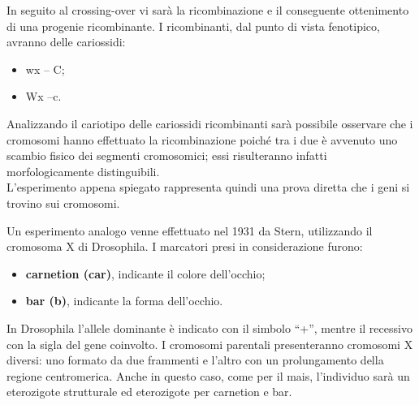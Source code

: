 \documentclass[11pt]{book}
\begin{document}
In seguito al crossing-over vi sarà la ricombinazione e il conseguente ottenimento di una progenie ricombinante. I ricombinanti, dal punto di vista fenotipico, avranno delle cariossidi:

\begin{itemize}
\item wx – C;
\item Wx –c.
\end{itemize}

Analizzando il cariotipo delle cariossidi ricombinanti sarà possibile osservare che i cromosomi hanno effettuato la ricombinazione poiché tra i due è avvenuto uno scambio fisico dei segmenti cromosomici; essi risulteranno infatti morfologicamente distinguibili.\\
L’esperimento appena spiegato rappresenta quindi una prova diretta che i geni si trovino sui cromosomi.

Un esperimento analogo venne effettuato nel 1931 da Stern, utilizzando il cromosoma X di Drosophila. I marcatori presi in considerazione furono:
\begin{itemize}
\item \textbf{carnetion (car)}, indicante il colore dell’occhio;
\item \textbf{bar (b)}, indicante la forma dell’occhio. 
\end{itemize}

In Drosophila l’allele dominante è indicato con il simbolo ``+'', mentre il recessivo con la sigla del gene coinvolto.
I cromosomi parentali presenteranno cromosomi X diversi: uno formato da due frammenti e l’altro con un prolungamento della regione centromerica. 
Anche in questo caso, come per il mais, l’individuo sarà un eterozigote strutturale ed eterozigote per carnetion e bar.
\end{document}
